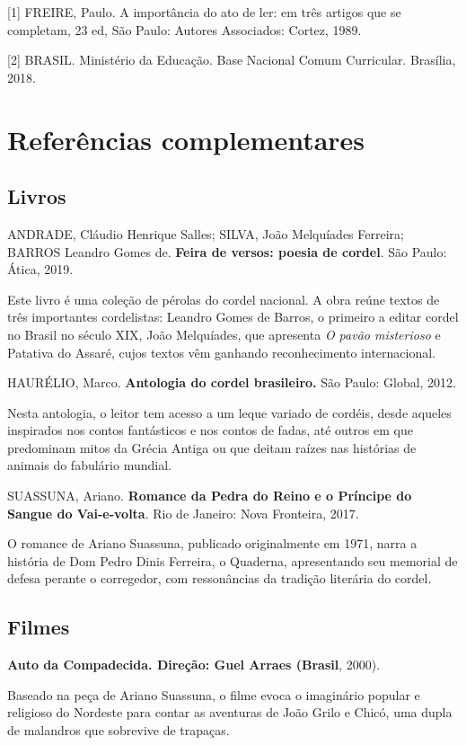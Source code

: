 \documentclass[12pt]{extarticle}
\begin{document}
{[}1{]} FREIRE, Paulo. A importância do ato de ler: em três artigos que
se completam, 23 ed, São Paulo: Autores Associados: Cortez, 1989.

{[}2{]} BRASIL. Ministério da Educação. Base Nacional Comum Curricular.
Brasília, 2018.

\section{Referências complementares}


\subsection{Livros}

  ANDRADE, Cláudio Henrique Salles; SILVA, João Melquíades Ferreira;
  BARROS Leandro Gomes de. \textbf{Feira de versos: poesia de cordel}.
  São Paulo: Ática, 2019.

Este livro é uma coleção de pérolas do cordel nacional. A obra reúne
textos de três importantes cordelistas: Leandro Gomes de Barros, o
primeiro a editar cordel no Brasil no século XIX, João Melquíades, que
apresenta \emph{O pavão misterioso} e Patativa do Assaré, cujos textos
vêm ganhando reconhecimento internacional.


  HAURÉLIO, Marco. \textbf{Antologia do cordel brasileiro.} São Paulo:
  Global, 2012.

Nesta antologia, o leitor tem acesso a um leque variado de cordéis,
desde aqueles inspirados nos contos fantásticos e nos contos de fadas,
até outros em que predominam mitos da Grécia Antiga ou que deitam raízes
nas histórias de animais do fabulário mundial.


  SUASSUNA, Ariano. \textbf{Romance da Pedra do Reino e o Príncipe do
  Sangue do Vai-e-volta}. Rio de Janeiro: Nova Fronteira, 2017.

O romance de Ariano Suassuna, publicado originalmente em 1971, narra a
história de Dom Pedro Dinis Ferreira, o Quaderna, apresentando seu
memorial de defesa perante o corregedor, com ressonâncias da tradição
literária do cordel.


\subsection{Filmes}

  \textbf{Auto da Compadecida. Direção: Guel Arraes (Brasil}, 2000).

Baseado na peça de Ariano Suassuna, o filme evoca o imaginário popular e
religioso do Nordeste para contar as aventuras de João Grilo e Chicó,
uma dupla de malandros que sobrevive de trapaças.
\end{document}
